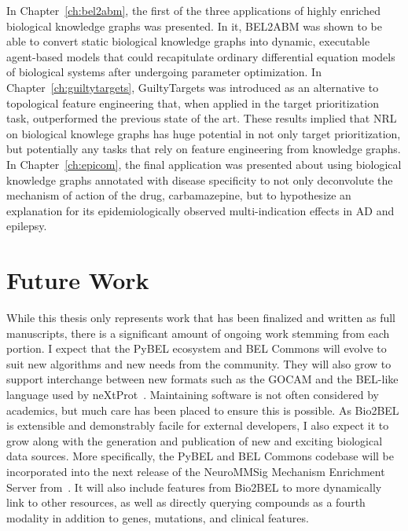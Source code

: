 In Chapter~\ref{ch:bel2abm}, the first of the three applications of highly enriched biological knowledge graphs was presented.
In it, BEL2ABM was shown to be able to convert static biological knowledge graphs into dynamic, executable agent-based models that could recapitulate ordinary differential equation models of biological systems after undergoing parameter optimization.
In Chapter~\ref{ch:guiltytargets}, GuiltyTargets was introduced as an alternative to topological feature engineering that, when applied in the target prioritization task, outperformed the previous state of the art.
These results implied that \ac{NRL} on biological knowlege graphs has huge potential in not only target prioritization, but potentially any tasks that rely on feature engineering from knowledge graphs.
In Chapter~\ref{ch:epicom}, the final application was presented about using biological knowledge graphs annotated with disease specificity to not only deconvolute the mechanism of action of the drug, carbamazepine, but to hypothesize an explanation for its epidemiologically observed multi-indication effects in \ac{AD} and epilepsy.

\section{Future Work}

While this thesis only represents work that has been finalized and written as full manuscripts, there is a significant amount of ongoing work stemming from each portion.
I expect that the PyBEL ecosystem and BEL Commons will evolve to suit new algorithms and new needs from the community.
They will also grow to support interchange between new formats such as the \ac{GOCAM} and the \ac{BEL}-like language used by neXtProt~\cite{Gaudet2017}.
Maintaining software is not often considered by academics, but much care has been placed to ensure this is possible.
As Bio2BEL is extensible and demonstrably facile for external developers, I also expect it to grow along with the generation and publication of new and exciting biological data sources.
More specifically, the PyBEL and BEL Commons codebase will be incorporated into the next release of the NeuroMMSig Mechanism Enrichment Server from~\cite{Domingo-Fernandez2017}.
It will also include features from Bio2BEL to more dynamically link to other resources, as well as directly querying compounds as a fourth modality in addition to genes, mutations, and clinical features.

